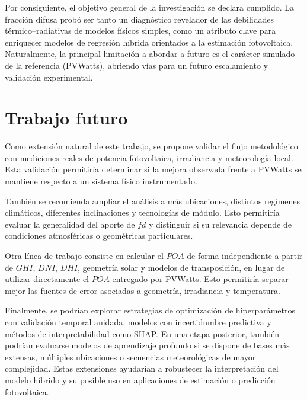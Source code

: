 \documentclass[12pt, letterpaper]{article}
\begin{document}
Por consiguiente, el objetivo general de la investigaci\'on se declara cumplido. La fracci\'on difusa prob\'o ser tanto un diagn\'ostico revelador de las debilidades t\'ermico--radiativas de modelos f\'isicos simples, como un atributo clave para enriquecer modelos de regresi\'on h\'ibrida orientados a la estimaci\'on fotovoltaica. Naturalmente, la principal limitaci\'on a abordar a futuro es el car\'acter simulado de la referencia (PVWatts), abriendo v\'ias para un futuro escalamiento y validaci\'on experimental.


\section{Trabajo futuro}

Como extensi\'on natural de este trabajo, se propone validar el flujo metodol\'ogico con mediciones reales de potencia fotovoltaica, irradiancia y meteorolog\'ia local. Esta validaci\'on permitir\'ia determinar si la mejora observada frente a PVWatts se mantiene respecto a un sistema f\'isico instrumentado.

Tambi\'en se recomienda ampliar el an\'alisis a m\'as ubicaciones, distintos reg\'imenes clim\'aticos, diferentes inclinaciones y tecnolog\'ias de m\'odulo. Esto permitir\'ia evaluar la generalidad del aporte de \(fd\) y distinguir si su relevancia depende de condiciones atmosf\'ericas o geom\'etricas particulares.

Otra l\'inea de trabajo consiste en calcular el \(POA\) de forma independiente a partir de \(GHI\), \(DNI\), \(DHI\), geometr\'ia solar y modelos de transposici\'on, en lugar de utilizar directamente el \(POA\) entregado por PVWatts. Esto permitir\'ia separar mejor las fuentes de error asociadas a geometr\'ia, irradiancia y temperatura.

Finalmente, se podr\'ian explorar estrategias de optimizaci\'on de hiperpar\'ametros con validaci\'on temporal anidada, modelos con incertidumbre predictiva y m\'etodos de interpretabilidad como SHAP. En una etapa posterior, tambi\'en podr\'ian evaluarse modelos de aprendizaje profundo si se dispone de bases m\'as extensas, m\'ultiples ubicaciones o secuencias meteorol\'ogicas de mayor complejidad. Estas extensiones ayudar\'ian a robustecer la interpretaci\'on del modelo h\'ibrido y su posible uso en aplicaciones de estimaci\'on o predicci\'on fotovoltaica.
\end{document}
